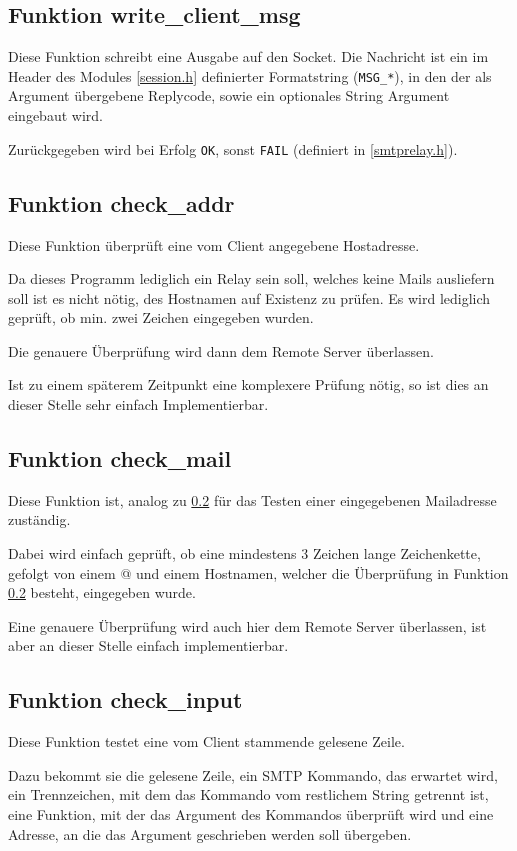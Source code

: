 \documentclass[pdftex,final,a4paper,10pt,notitlepage,halfparskip]{scrreprt}
\begin{document}
\subsection{Funktion write\_client\_msg}\label{fn:write_client_msg}
Diese Funktion schreibt eine Ausgabe auf den Socket. Die Nachricht ist ein im Header des Modules \ref{session.h} definierter Formatstring (\texttt{MSG\_*}), in den der als Argument übergebene Replycode, sowie ein optionales String Argument eingebaut wird.

Zurückgegeben wird bei Erfolg \texttt{OK}, sonst \texttt{FAIL} (definiert in \ref{smtprelay.h}).

\subsection{Funktion check\_addr}\label{fn:check_addr}
Diese Funktion überprüft eine vom Client angegebene Hostadresse. 

Da dieses Programm lediglich ein Relay sein soll, welches keine Mails ausliefern soll ist es nicht nötig, des Hostnamen auf Existenz zu prüfen. Es wird lediglich geprüft, ob min. zwei Zeichen eingegeben wurden. 

Die genauere Überprüfung wird dann dem Remote Server überlassen.

Ist zu einem späterem Zeitpunkt eine komplexere Prüfung nötig, so ist dies an dieser Stelle sehr einfach Implementierbar.

\subsection{Funktion check\_mail}\label{fn:check_mail}
Diese Funktion ist, analog zu \ref{fn:check_addr} für das Testen einer eingegebenen Mailadresse zuständig. 

Dabei wird einfach geprüft, ob eine mindestens 3 Zeichen lange Zeichenkette, gefolgt von einem @ und einem Hostnamen, welcher die Überprüfung in Funktion \ref{fn:check_addr} besteht, eingegeben wurde.

Eine genauere Überprüfung wird auch hier dem Remote Server überlassen, ist aber an dieser Stelle einfach implementierbar.

\subsection{Funktion check\_input}\label{fn:check_input}
Diese Funktion testet eine vom Client stammende gelesene Zeile.

Dazu bekommt sie die gelesene Zeile, ein SMTP Kommando, das erwartet wird, ein Trennzeichen, mit dem das Kommando vom restlichem String getrennt ist, eine Funktion, mit der das Argument des Kommandos überprüft wird und eine Adresse, an die das Argument geschrieben werden soll übergeben.
\end{document}
